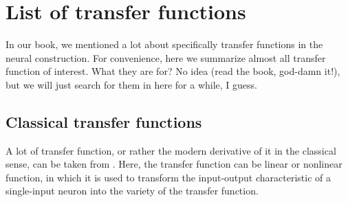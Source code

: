 \chapter{List of transfer functions}
In our book, we mentioned a lot about specifically transfer functions in the neural construction. For convenience, here we summarize almost all transfer function of interest. What they are for? No idea (read the book, god-damn it!), but we will just search for them in here for a while, I guess. 

\section{Classical transfer functions}
A lot of transfer function, or rather the modern derivative of it in the classical sense, can be taken from \cite{10.5555/2721661}. Here, the transfer function can be linear or nonlinear function, in which it is used to transform the input-output characteristic of a single-input neuron into the variety of the transfer function. 
